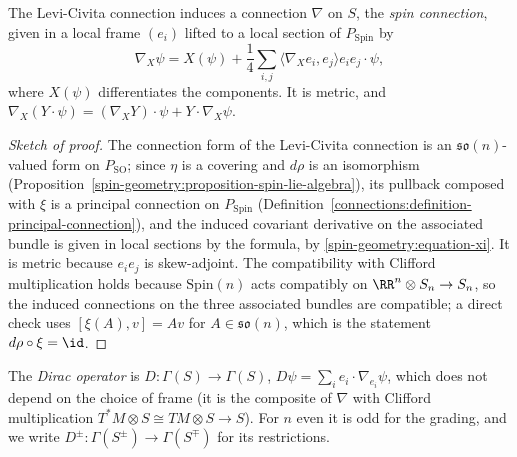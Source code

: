 \begin{proposition}\label{spin-geometry:proposition-spin-connection}
The Levi-Civita connection induces a connection $\nabla$ on $S$, the \emph{spin connection}, given in a local frame $(e_i)$ lifted to a local section of $P_{\mathrm{Spin}}$ by
\[
\nabla_X\psi = X(\psi) + \frac14\sum_{i,j}\langle\nabla_Xe_i, e_j\rangle e_ie_j \cdot \psi,
\]
where $X(\psi)$ differentiates the components. It is metric, and $\nabla_X(Y \cdot \psi) = (\nabla_XY) \cdot \psi + Y \cdot \nabla_X\psi$.
\end{proposition}

\begin{proof}[Sketch of proof]
The connection form of the Levi-Civita connection is an $\mathfrak{so}(n)$-valued form on $P_{\mathrm{SO}}$; since $\eta$ is a covering and $d\rho$ is an isomorphism (Proposition~\ref{spin-geometry:proposition-spin-lie-algebra}), its
pullback composed with $\xi$ is a principal connection on $P_{\mathrm{Spin}}$ (Definition~\ref{connections:definition-principal-connection}), and the induced covariant derivative on the associated bundle is given in local sections by the
formula, by \eqref{spin-geometry:equation-xi}. It is metric because $e_ie_j$ is skew-adjoint. The compatibility with Clifford multiplication holds because $\mathrm{Spin}(n)$ acts compatibly on $\RR^n \otimes S_n \to S_n$, so the
induced connections on the three associated bundles are compatible; a direct check uses $[\xi(A), v] = Av$ for $A \in \mathfrak{so}(n)$, which is the statement $d\rho \circ \xi = \id$.
\end{proof}

\begin{definition}\label{spin-geometry:definition-dirac-operator}
The \emph{Dirac operator} is $D \colon \Gamma(S) \to \Gamma(S)$, $D\psi = \sum_ie_i \cdot \nabla_{e_i}\psi$, which does not depend on the choice of frame (it is the composite of $\nabla$ with Clifford multiplication
$T^*M \otimes S \cong TM \otimes S \to S$). For $n$ even it is odd for the grading, and we write $D^\pm \colon \Gamma(S^\pm) \to \Gamma(S^\mp)$ for its restrictions.
\end{definition}

